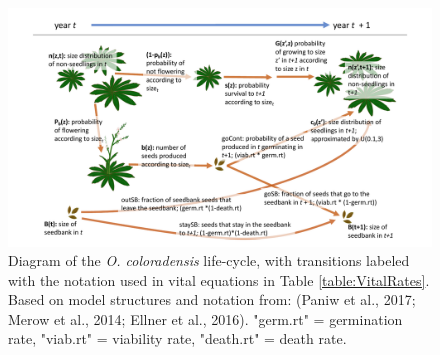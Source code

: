 \documentclass[12pt, letterpaper]{article}
\begin{document}
\begin{figure}[ht!]
    \centering
    \includegraphics[width=1\textwidth]{figures/COBP_lifecyclediagram_new.pdf}
    \caption{\internallinenumbers
    Diagram of the \textit{O. coloradensis} life-cycle, with transitions labeled with the notation used in vital equations in Table \ref{table:VitalRates}. Based on model structures and notation from: (Paniw et al., 2017; Merow et al., 2014; Ellner et al., 2016). "germ.rt" = germination rate, "viab.rt" = viability rate, "death.rt" = death rate.}
 \label{fig:lifecycle}
\end{figure}
\end{document}
